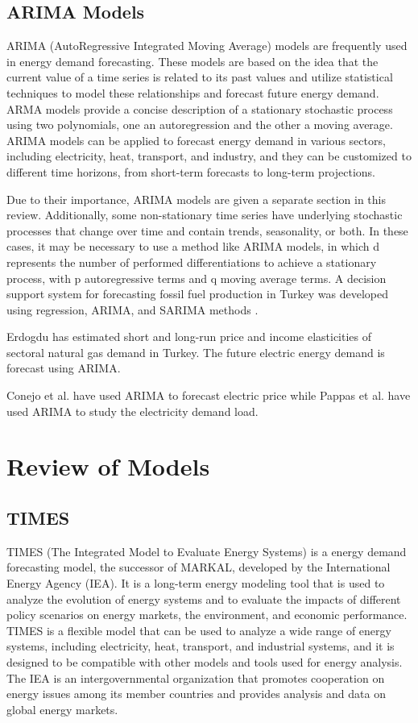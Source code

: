 \documentclass[lettersize,journal]{IEEEtran}
\begin{document}
  \subsection{ARIMA Models}
  ARIMA (AutoRegressive Integrated Moving Average) models are frequently used in energy demand forecasting. These models are based on the idea that the current value of a time series is related to its past values and utilize statistical techniques to model these relationships and forecast future energy demand. ARMA models provide a concise description of a stationary stochastic process using two polynomials, one an autoregression and the other a moving average. ARIMA models can be applied to forecast energy demand in various sectors, including electricity, heat, transport, and industry, and they can be customized to different time horizons, from short-term forecasts to long-term projections.

  Due to their importance, ARIMA models are given a separate section in this review. Additionally, some non-stationary time series have underlying stochastic processes that change over time and contain trends, seasonality, or both. In these cases, it may be necessary to use a method like ARIMA models, in which d represents the number of performed differentiations to achieve a stationary process, with p autoregressive terms and q moving average terms\cite{Box}. A decision support system for forecasting fossil fuel production in Turkey was developed using regression, ARIMA, and SARIMA methods \cite{Ediger 1, Ediger 2}.
 
  Erdogdu\cite{Erdogdu} has estimated short and long-run price and income elasticities of sectoral natural gas demand in Turkey. The future electric energy demand is forecast using ARIMA. 
  

  Conejo et al.\cite{Conejo} have used ARIMA to forecast electric price while Pappas et al.\cite{Pappas} have used ARIMA to study the electricity demand load.
 

\section{Review of Models}
  \subsection{TIMES}
  TIMES (The Integrated Model to Evaluate Energy Systems) is a energy demand forecasting model, the successor of MARKAL, developed by the International Energy Agency (IEA). It is a long-term energy modeling tool that is used to analyze the evolution of energy systems and to evaluate the impacts of different policy scenarios on energy markets, the environment, and economic performance. TIMES is a flexible model that can be used to analyze a wide range of energy systems, including electricity, heat, transport, and industrial systems, and it is designed to be compatible with other models and tools used for energy analysis. The IEA is an intergovernmental organization that promotes cooperation on energy issues among its member countries and provides analysis and data on global energy markets. 
\end{document}
